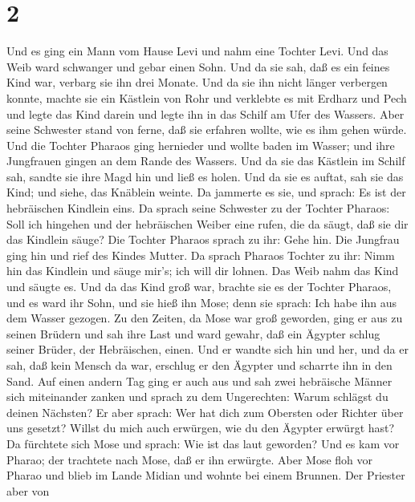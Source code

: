 \hypertarget{section-1}{%
\section{2}\label{section-1}}

 Und es ging ein Mann vom Hause Levi und nahm eine Tochter
Levi.  Und das Weib ward schwanger und gebar einen Sohn. Und
da sie sah, daß es ein feines Kind war, verbarg sie ihn drei Monate.
 Und da sie ihn nicht länger verbergen konnte, machte sie
ein Kästlein von Rohr und verklebte es mit Erdharz und Pech und legte
das Kind darein und legte ihn in das Schilf am Ufer des Wassers.
 Aber seine Schwester stand von ferne, daß sie erfahren
wollte, wie es ihm gehen würde.  Und die Tochter Pharaos
ging hernieder und wollte baden im Wasser; und ihre Jungfrauen gingen an
dem Rande des Wassers. Und da sie das Kästlein im Schilf sah, sandte sie
ihre Magd hin und ließ es holen.  Und da sie es auftat, sah
sie das Kind; und siehe, das Knäblein weinte. Da jammerte es sie, und
sprach: Es ist der hebräischen Kindlein eins.  Da sprach
seine Schwester zu der Tochter Pharaos: Soll ich hingehen und der
hebräischen Weiber eine rufen, die da säugt, daß sie dir das Kindlein
säuge?  Die Tochter Pharaos sprach zu ihr: Gehe hin. Die
Jungfrau ging hin und rief des Kindes Mutter.  Da sprach
Pharaos Tochter zu ihr: Nimm hin das Kindlein und säuge mir's; ich will
dir lohnen. Das Weib nahm das Kind und säugte es.  Und da
das Kind groß war, brachte sie es der Tochter Pharaos, und es ward ihr
Sohn, und sie hieß ihn Mose; denn sie sprach: Ich habe ihn aus dem
Wasser gezogen.  Zu den Zeiten, da Mose war groß geworden,
ging er aus zu seinen Brüdern und sah ihre Last und ward gewahr, daß ein
Ägypter schlug seiner Brüder, der Hebräischen, einen.  Und
er wandte sich hin und her, und da er sah, daß kein Mensch da war,
erschlug er den Ägypter und scharrte ihn in den Sand.  Auf
einen andern Tag ging er auch aus und sah zwei hebräische Männer sich
miteinander zanken und sprach zu dem Ungerechten: Warum schlägst du
deinen Nächsten?  Er aber sprach: Wer hat dich zum Obersten
oder Richter über uns gesetzt? Willst du mich auch erwürgen, wie du den
Ägypter erwürgt hast? Da fürchtete sich Mose und sprach: Wie ist das
laut geworden?  Und es kam vor Pharao; der trachtete nach
Mose, daß er ihn erwürgte. Aber Mose floh vor Pharao und blieb im Lande
Midian und wohnte bei einem Brunnen.  Der Priester aber von
